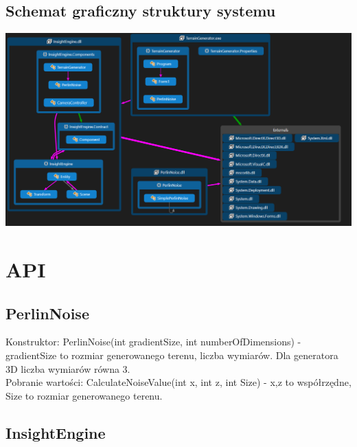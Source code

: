 \documentclass[12pt,a4paper]{article}
\begin{document}
\subsection{Schemat graficzny struktury systemu}
\includegraphics[width=1\textwidth]{images/klasy.png}
\section{API}
\subsection{PerlinNoise}
Konstruktor: PerlinNoise(int gradientSize, int numberOfDimensions) - gradientSize to rozmiar generowanego terenu, liczba wymiarów. Dla generatora 3D liczba wymiarów równa 3.\\
Pobranie wartości: CalculateNoiseValue(int x, int z, int Size) - x,z to współrzędne, Size to rozmiar generowanego terenu.
\subsection{InsightEngine}
\end{document}
